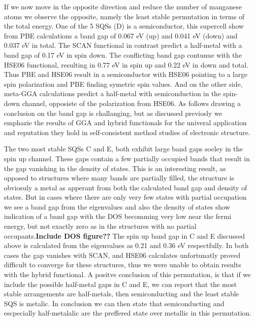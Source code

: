If we now move in the opposite direction and reduce the number of manganese atoms we observe the opposite, namely the least stable permutation in terms of the total energy. One of the 5 SQSs (D) is a semiconductor, this supercell show from PBE calculations a band gap of 0.067 eV (up) and 0.041 eV (down) and 0.037 eV in total. The SCAN functional in contrast predict a half-metal with a band gap of 0.17 eV in spin down. The conflicting band gap contunue with the HSE06 functional, resulting in 0.77 eV in spin up and 0.22 eV in down and total. Thus PBE and HSE06 result in a semiconductor with HSE06 pointing to a large spin polarization and PBE finding symetric spin values. And on the other side, meta-GGA calculations predict a half-metal with semiconduction in the spin-down channel, opposiste of the polarization from HSE06. As follows drawing a conclusion on the band gap is challanging, but as discussed previosly we emphazie the results of GGA and hybrid functionals for the univeral application and reputation they hold in self-consistent method studies of electronic structure. 

The two most stable SQSs C and E, both exhibit large band gaps soeley in the spin up channel. These gaps contain a few partially occupied bands that result in the gap vanishing in the density of states. This is an interesting result, as opposed to structures where many bands are partially filled, the structure is obviosuly a metal as apperant from both the calculated band gap and density of states. But in cases where there are only very few states with partial occupation we see a band gap from the eigenvalues and also the density of states show indication of a band gap with the DOS becomming very low near the fermi energy, but not exactly zero as in the structures with no partial occupants.\textbf{Include DOS figure??} The spin up band gap in C and E discussed above is calculated from the eigenvalues as 0.21 and 0.36 eV respectfully. In both cases the gap vanishes with SCAN, and HSE06 calculates unfortunatly proved difficult to converge for these structures, thus we were unable to obtain results with the hybrid functional. A positve conclusion of this permutation, is that if we include the possible half-metal gaps in C and E, we can report that the most stable arrangements are half-metals, then semiconducting and the least stable SQS is metalic. In conclusion we can then state that semiconducting and escpecially half-metalalic are the preffered state over metallic in this permutation.     

